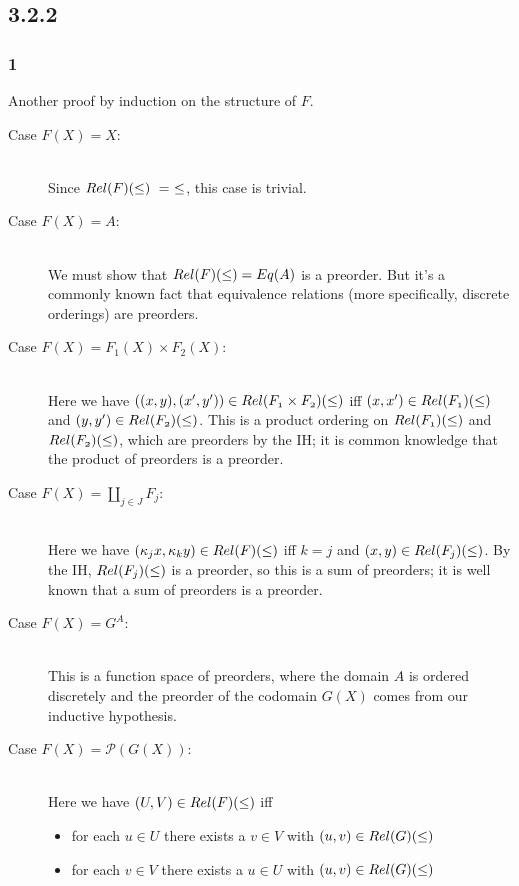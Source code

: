 \documentclass{article}
\begin{document}
\subsection*{3.2.2}

\subsubsection*{1}

Another proof by induction on the structure of $F$.

\begin{description}
\item[Case $F(X) = X$:]~\\
Since $\mit{Rel}(F)(\leq)~=~\leq$, this case is trivial.
\item[Case $F(X) = A$:]~\\
We must show that $\mit{Rel}(F)(\leq) = \mit{Eq}(A)$ is a preorder. But it's a commonly known fact
that equivalence relations (more specifically, discrete orderings) are preorders.
\item[Case $F(X) = F_1(X) \times F_2(X)$:]~\\
Here we have $((x,y),(x',y')) \in \mit{Rel}(F_1 \times F_2)(\leq)$ iff $(x,x') \in \mit{Rel}(F_1)(\leq)$ and $(y,y') \in \mit{Rel}(F_2)(\leq)$. This is a product ordering on $\mit{Rel}(F_1)(\leq)$ and $\mit{Rel}(F_2)(\leq)$, which are preorders by the IH; it is common knowledge that
the product of preorders is a preorder.
\item[Case $F(X) = \coprod_{j \in J} F_j$:]~\\
Here we have $(\kappa_j x, \kappa_k y) \in \mit{Rel}(F)(\leq)$ iff $k = j$ and $(x,y) \in \mit{Rel}(F_j)(\leq)$.
By the IH, $\mit{Rel}(F_j)(\leq)$ is a preorder, so this is a sum of preorders; it is well known that
a sum of preorders is a preorder.

\item[Case $F(X) = G^A$:]~\\
This is a function space of preorders, where the domain $A$ is ordered discretely and the preorder of the codomain $G(X)$
comes from our inductive hypothesis.

\item[Case $F(X) = \mathcal P(G(X))$:]~\\

Here we have $(U, V) \in \mit{Rel}(F)(\leq)$ iff 
\begin{itemize}
\item for each $u \in U$ there exists a $v \in V$ with $(u,v) \in \mit{Rel}(G)(\leq)$
\item for each $v \in V$ there exists a $u \in U$ with $(u,v) \in \mit{Rel}(G)(\leq)$ 
\end{itemize}


\end{description}
\end{document}
